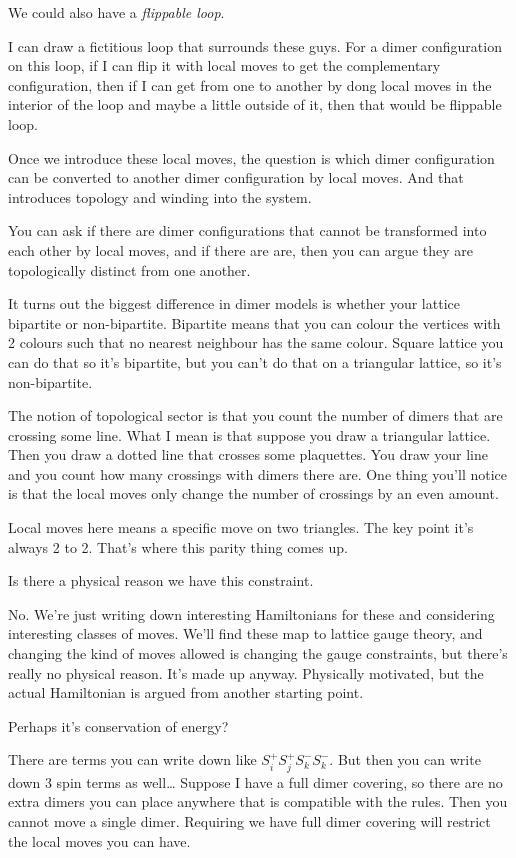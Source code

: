 We could also have a \emph{flippable loop}.

I can draw a fictitious loop that surrounds these guys.
For a dimer configuration on this loop,
if I can flip it with local moves to get the complementary configuration,
then if I can get from one to another by dong local moves in the interior of
the loop and maybe a little outside of it,
then that would be  flippable loop.

Once we introduce these local moves,
the question is which dimer configuration can be converted to another dimer
configuration by local moves.
And that introduces topology and winding into the system.

You can ask if there are dimer configurations that cannot be transformed into
each other by local moves,
and if there are are,
then you can argue they are topologically distinct from one another.

It turns out the biggest difference in dimer models is whether your lattice
bipartite or non-bipartite.
Bipartite means that you can colour the vertices with 2 colours such that no
nearest neighbour has the same colour.
Square lattice you can do that so it's bipartite,
but you can't do that on a triangular lattice, so it's non-bipartite.

The notion of topological sector is that you count the number of dimers that are
crossing some line.
What I mean is that suppose you draw a triangular lattice.
Then you draw a dotted line that crosses some plaquettes.
You draw your line and you count how many crossings with dimers there are.
One thing you'll notice is that the local moves only change the number of
crossings by an even amount.

Local moves here means a specific move on two triangles.
The key point it's always 2 to 2.
That's where this parity thing comes up.

\begin{question}
    Is there a physical reason we have this constraint.
\end{question}
No.
We're just writing down interesting Hamiltonians for these and considering
interesting classes of moves.
We'll find these map to lattice gauge theory,
and changing the kind of moves allowed is changing the gauge constraints,
but there's really no physical reason.
It's made up anyway.
Physically motivated,
but the actual Hamiltonian is argued from another starting point.

\begin{question}
    Perhaps it's conservation of energy?
\end{question}
There are terms you can write down like
$S_i^+ S_j^+ S_k^- S_k^-$.
But then you can write down 3 spin terms as well\ldots
Suppose I have a full dimer covering,
so there are no extra dimers you can place anywhere that is compatible with the
rules.
Then you cannot move a single dimer.
Requiring we have  full dimer covering will restrict the local moves you can
have.

